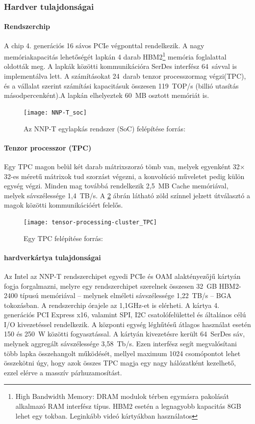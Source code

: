 \subsubsection{Hardver tulajdonságai}
\paragraph[Soc]{Rendszerchip}
A chip 4. generációs 16 sávos PCIe végponttal rendelkezik. A nagy memóriakapacitás lehetőségét lapkán 4 darab HBM2\footnote{High Bandwidth Memory: DRAM modulok térben egymásra pakolását alkalmazó RAM interfész típus. HBM2 esetén a legnagyobb kapacitás 8GB lehet egy tokban. Leginkább videó kártyákban használatos } memória foglalattal oldották meg. A lapkák közötti kommunikációra SerDes interfész 64~sávval is implementálva lett.
A számításokat 24~darab tenzor processzormag végzi(TPC), és a vállalat szerint számítási kapacitásuk összesen 119~TOP/s (billió utasítás másodpercenként).A lapkán elhelyeztek 60~MB osztott memóriát is.
\begin{figure}[H]
	\centering
	\texttt{[image: NNP-T\_soc]}
	\caption[SoC]{Az NNP-T egylapkás rendszer (SoC) felépítése \footnotesize forrás:\cite{yang-nnpt}}
	\label{fig:nnp-tsoc}
\end{figure}

\paragraph{Tenzor processzor (TPC)}
Egy TPC magon belül két darab mátrixszorzó tömb van, melyek egyenként 32$\times$32-es méretű mátrixok tud szorzást végezni, a konvolúció műveletet pedig külön egység végzi. Minden mag továbbá rendelkezik 2,5~MB Cache memóriával, melyek sávszélessége 1,4~TB/s. A \ref{fig:TPC} ábrán látható zöld színnel jelzett útválasztó a magok közötti kommunikációért felelős. 
\begin{figure}[H]
	\centering
	\texttt{[image: tensor-processing-cluster\_TPC]}
	\caption[TPC]{Egy TPC felépítése \footnotesize forrás:\cite{yang-nnpt}}
	\label{fig:TPC}
\end{figure}

\paragraph{hardverkártya tulajdonságai}
Az Intel az NNP-T rendszerchipet egyedi PCIe és OAM alaktényezőjű kártyán fogja forgalmazni, melyre egy rendszerchipet szerelnek összesen 32~GB HBM2-2400 típusú memóriával -- melynek elméleti sávszélessége 1,22~TB/s -- BGA tokozásban.
A rendszerchip órajele az 1,1GHz-et is elérheti. A kártya 4. generációs PCI Express x16, valamint SPI, I2C csatolófelülettel és általános célú I/O kivezetéssel rendelkezik. A központi egység léghűtésű átlagos használat esetén 150 és 250~W közötti fogyasztással. A kártyán kivezetésre került 64~SerDes sáv, melynek aggregált sávszélessége 3,58~Tb/s. Ezen interfész segít megvalósítani több lapka összehangolt működését, mellyel maximum 1024 csomópontot lehet összekötni úgy, hogy azok összes TPC magja egy nagy hálózatként kezelhető, ezzel elérve a masszív párhuzamosítást. 

